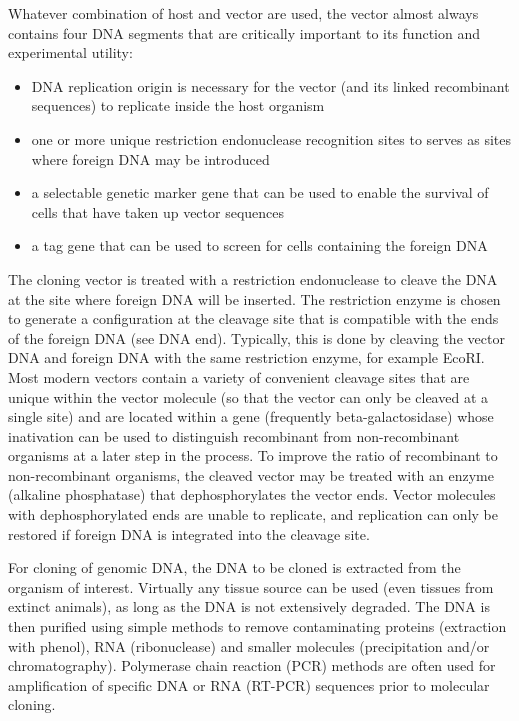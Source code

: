 Whatever combination of host and vector are used, the vector almost always contains four DNA segments that are critically important to its function and experimental utility:

\begin{itemize}
\tightlist
\item
  DNA replication origin is necessary for the vector (and its linked recombinant sequences) to replicate inside the host organism
\item
  one or more unique restriction endonuclease recognition sites to serves as sites where foreign DNA may be introduced
\item
  a selectable genetic marker gene that can be used to enable the survival of cells that have taken up vector sequences
\item
  a tag gene that can be used to screen for cells containing the foreign DNA
\end{itemize}

The cloning vector is treated with a restriction endonuclease to cleave the DNA at the site where foreign DNA will be inserted. The restriction enzyme is chosen to generate a configuration at the cleavage site that is compatible with the ends of the foreign DNA (see DNA end). Typically, this is done by cleaving the vector DNA and foreign DNA with the same restriction enzyme, for example EcoRI. Most modern vectors contain a variety of convenient cleavage sites that are unique within the vector molecule (so that the vector can only be cleaved at a single site) and are located within a gene (frequently beta-galactosidase) whose inativation can be used to distinguish recombinant from non-recombinant organisms at a later step in the process. To improve the ratio of recombinant to non-recombinant organisms, the cleaved vector may be treated with an enzyme (alkaline phosphatase) that dephosphorylates the vector ends. Vector molecules with dephosphorylated ends are unable to replicate, and replication can only be restored if foreign DNA is integrated into the cleavage site.

For cloning of genomic DNA, the DNA to be cloned is extracted from the organism of interest. Virtually any tissue source can be used (even tissues from extinct animals), as long as the DNA is not extensively degraded. The DNA is then purified using simple methods to remove contaminating proteins (extraction with phenol), RNA (ribonuclease) and smaller molecules (precipitation and/or chromatography). Polymerase chain reaction (PCR) methods are often used for amplification of specific DNA or RNA (RT-PCR) sequences prior to molecular cloning.

